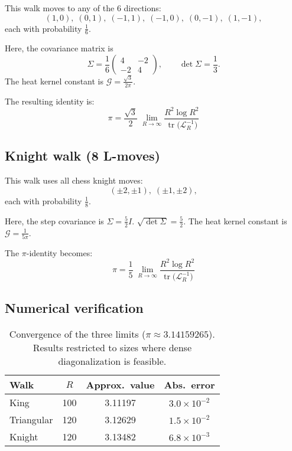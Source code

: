 \documentclass{article}
\numberwithin{equation}{section}
\theoremstyle{definition}
\theoremstyle{remark}
\newcommand{\cG}{\mathcal{G}}
\DeclareMathOperator{\tr}{tr}
\begin{document}
This walk moves to any of the 6 directions:
\[
(1,0),\;(0,1),\;(-1,1),\;(-1,0),\;(0,-1),\;(1,-1),
\]
each with probability \( \tfrac16 \).

Here, the covariance matrix is
\[
\Sigma
=\frac{1}{6}
\begin{pmatrix}
4 & -2 \\
-2 & 4
\end{pmatrix},
\qquad
\det\Sigma = \frac{1}{3}.
\]
The heat kernel constant is $\cG = \frac{\sqrt{3}}{2\pi}$.

The resulting identity is:
\begin{equation}\label{eq:Tri_pi}
\boxed{\;\displaystyle \pi=\frac{\sqrt{3}}{2}\;\lim_{R\to\infty}\frac{R^{2}\log R^{2}}{\tr\!\bigl(\mathcal{L}_R^{-1}\bigr)}\;}
\end{equation}


\subsection{Knight walk (8 L-moves)}\label{app:knight}

This walk uses all chess knight moves:
\[
(\pm2,\pm1),\;(\pm1,\pm2),
\]
each with probability \( \tfrac{1}{8} \).

Here, the step covariance is \( \Sigma = \tfrac{5}{2} I \). $\sqrt{\det\Sigma} = \frac{5}{2}$.
The heat kernel constant is $\cG = \frac{1}{5\pi}$.

The $\pi$-identity becomes:
\begin{equation}\label{eq:Knight_pi}
\boxed{\;\displaystyle \pi=\frac{1}{5}\;\lim_{R\to\infty}\frac{R^{2}\log R^{2}}{\tr\!\bigl(\mathcal{L}_R^{-1}\bigr)}\;}
\end{equation}


\subsection{Numerical verification}\label{app:numerical}

\begin{table}[h]
\centering
\caption{Convergence of the three limits ($\pi\approx3.14159265$). Results restricted to sizes where dense diagonalization is feasible.}
\label{tab:numeric_pi}
\begin{tabular}{@{}lccc@{}}
\toprule
Walk & $R$ & Approx.\ value & Abs.\ error \\
\midrule
King & 100 & 3.11197 & $3.0 \times 10^{-2}$ \\
\addlinespace
Triangular & 120 & 3.12629 & $1.5\times10^{-2}$ \\
\addlinespace
Knight & 120 & 3.13482 & $6.8\times10^{-3}$ \\
\bottomrule
\end{tabular}
\end{table}
\end{document}
